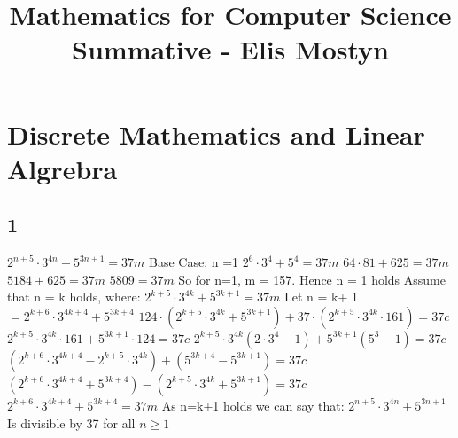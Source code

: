 \documentclass{article}
\title{Mathematics for Computer Science Summative - Elis Mostyn}
\begin{document}
	\maketitle
	\newpage
	\section {Discrete Mathematics and Linear Algrebra}
	\subsection*{1}
	$ 2^{n+5} \cdot 3^{4n} + 5^{3n+1} = 37m$
	\newline
	Base Case:  n =1 
	\newline
	$ 2^6 \cdot 3^4 + 5^4 = 37m$
	\newline
	$64\cdot81 + 625 = 37m$
	\newline
	$5184 + 625 = 37m$
	\newline
	$5809 = 37m$
	\newline
	So for n=1, m = 157. Hence n = 1 holds
	\newline
	Assume that n = k holds, where:
	\newline
	$ 2^{k+5} \cdot 3^{4k} + 5^{3k+1} = 37m $
	\newline
	\newline
	Let n = k+ 1 $ = 2^{k+6} \cdot 3^{4k+4} + 5^{3k+4}  $
	\newline
	$ 124 \cdot (2^{k+5} \cdot 3^{4k} + 5^{3k+1})+37\cdot(2^{k+5} \cdot 3^{4k}\cdot161)=37c$
	\newline
	$2^{k+5} \cdot 3^{4k}\cdot161 + 5^{3k+1}\cdot124 = 37c$
	\newline
	$2^{k+5}\cdot3^{4k}(2\cdot3^4-1)+ 5^{3k+1}(5^3-1)=37c$
	\newline
	$(2^{k+6}\cdot3^{4k+4}-2^{k+5}\cdot3^{4k}) +(5^{3k+4}-5^{3k+1}) = 37c $
	\newline
	$(2^{k+6}\cdot3^{4k+4}+5^{3k+4})-(2^{k+5}\cdot3^{4k}+5^{3k+1}) = 37c $
	\newline
	$2^{k+6}\cdot3^{4k+4}+5^{3k+4} = 37m$
	\newline
	As n=k+1 holds we can say that:
	\newline
	$ 2^{n+5} \cdot 3^{4n} + 5^{3n+1}  $
	\newline
	Is divisible by 37 for all $ n \geqslant 1 $
\end{document}
